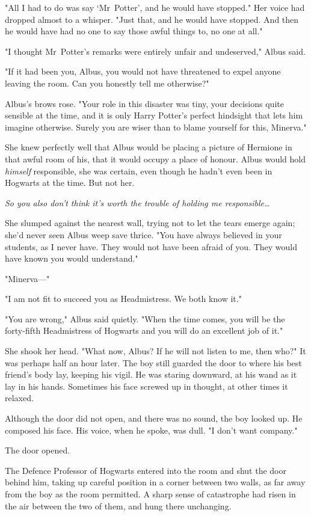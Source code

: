 "All I had to do was say `Mr~Potter', and he would have stopped." Her voice
had dropped almost to a whisper. "Just that, and he would have stopped. And
then he would have had no one to say those awful things to, no one at all."

"I thought Mr~Potter's remarks were entirely unfair and undeserved," Albus
said.

"If it had been you, Albus, you would not have threatened to expel anyone
leaving the room. Can you honestly tell me otherwise?"

Albus's brows rose. "Your role in this disaster was tiny, your decisions quite
sensible at the time, and it is only Harry Potter's perfect hindsight that lets
him imagine otherwise. Surely you are wiser than to blame yourself for this,
Minerva."

She knew perfectly well that Albus would be placing a picture of Hermione in
that awful room of his, that it would occupy a place of honour. Albus would hold
\emph{himself} responsible, she was certain, even though he hadn't even been in
Hogwarts at the time. But not her.

\emph{So you also don't think it's worth the trouble of holding me
responsible{\ldots}}

She slumped against the nearest wall, trying not to let the tears emerge again;
she'd never seen Albus weep save thrice. "You have always believed in your
students, as I never have. They would not have been afraid of you. They would
have known you would understand."

"Minerva---"

"I am not fit to succeed you as Headmistress. We both know it."

"You are wrong," Albus said quietly. "When the time comes, you will be the
forty-fifth Headmistress of Hogwarts and you will do an excellent job of it."

She shook her head. "What now, Albus? If he will not listen to me, then who?"
\later
It was perhaps half an hour later. The boy still guarded the door to where his
best friend's body lay, keeping his vigil. He was staring downward, at his wand
as it lay in his hands. Sometimes his face screwed up in thought, at other
times it relaxed.

Although the door did not open, and there was no sound, the boy looked up. He
composed his face. His voice, when he spoke, was dull. "I don't want company."

The door opened.

The Defence Professor of Hogwarts entered into the room and shut the door
behind him, taking up careful position in a corner between two walls, as far
away from the boy as the room permitted. A sharp sense of catastrophe had risen
in the air between the two of them, and hung there unchanging.

